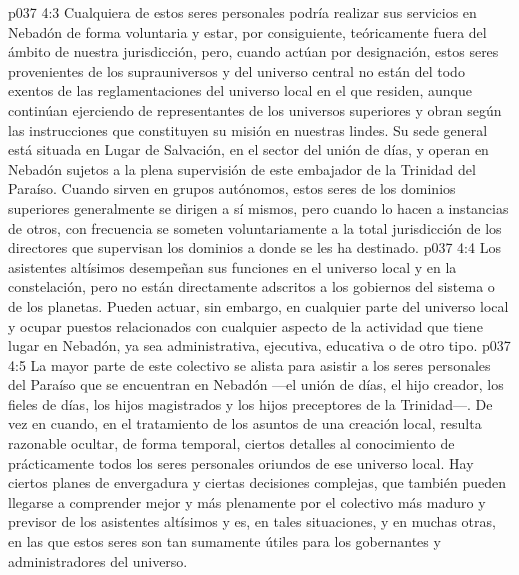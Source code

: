 \vs p037 4:3 Cualquiera de estos seres personales podría realizar sus servicios en Nebadón de forma voluntaria y estar, por consiguiente, teóricamente fuera del ámbito de nuestra jurisdicción, pero, cuando actúan por designación, estos seres provenientes de los suprauniversos y del universo central no están del todo exentos de las reglamentaciones del universo local en el que residen, aunque continúan ejerciendo de representantes de los universos superiores y obran según las instrucciones que constituyen su misión en nuestras lindes. Su sede general está situada en Lugar de Salvación, en el sector del unión de días, y operan en Nebadón sujetos a la plena supervisión de este embajador de la Trinidad del Paraíso. Cuando sirven en grupos autónomos, estos seres de los dominios superiores generalmente se dirigen a sí mismos, pero cuando lo hacen a instancias de otros, con frecuencia se someten voluntariamente a la total jurisdicción de los directores que supervisan los dominios a donde se les ha destinado.
\vs p037 4:4 Los asistentes altísimos desempeñan sus funciones en el universo local y en la constelación, pero no están directamente adscritos a los gobiernos del sistema o de los planetas. Pueden actuar, sin embargo, en cualquier parte del universo local y ocupar puestos relacionados con cualquier aspecto de la actividad que tiene lugar en Nebadón, ya sea administrativa, ejecutiva, educativa o de otro tipo.
\vs p037 4:5 La mayor parte de este colectivo se alista para asistir a los seres personales del Paraíso que se encuentran en Nebadón ---el unión de días, el hijo creador, los fieles de días, los hijos magistrados y los hijos preceptores de la Trinidad---. De vez en cuando, en el tratamiento de los asuntos de una creación local, resulta razonable ocultar, de forma temporal, ciertos detalles al conocimiento de prácticamente todos los seres personales oriundos de ese universo local. Hay ciertos planes de envergadura y ciertas decisiones complejas, que también pueden llegarse a comprender mejor y más plenamente por el colectivo más maduro y previsor de los asistentes altísimos y es, en tales situaciones, y en muchas otras, en las que estos seres son tan sumamente útiles para los gobernantes y administradores del universo.

